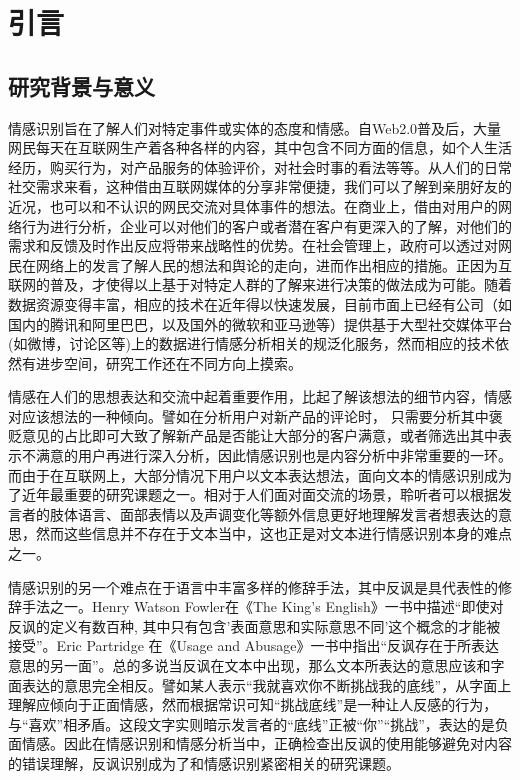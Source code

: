 \chapter{引言}
\label{cha:intro}

\section{研究背景与意义}

情感识别旨在了解人们对特定事件或实体的态度和情感。自Web2.0普及后，大量网民每天在互联网生产着各种各样的内容，其中包含不同方面的信息，如个人生活经历，购买行为，对产品服务的体验评价，对社会时事的看法等等。从人们的日常社交需求来看，这种借由互联网媒体的分享非常便捷，我们可以了解到亲朋好友的近况，也可以和不认识的网民交流对具体事件的想法。在商业上，借由对用户的网络行为进行分析，企业可以对他们的客户或者潜在客户有更深入的了解，对他们的需求和反馈及时作出反应将带来战略性的优势。在社会管理上，政府可以透过对网民在网络上的发言了解人民的想法和舆论的走向，进而作出相应的措施。正因为互联网的普及，才使得以上基于对特定人群的了解来进行决策的做法成为可能。随着数据资源变得丰富，相应的技术在近年得以快速发展，目前市面上已经有公司（如国内的腾讯和阿里巴巴，以及国外的微软和亚马逊等）提供基于大型社交媒体平台(如微博，讨论区等)上的数据进行情感分析相关的规泛化服务，然而相应的技术依然有进步空间，研究工作还在不同方向上摸索。

情感在人们的思想表达和交流中起着重要作用\cite{Banerjee2015Detection}，比起了解该想法的细节内容，情感对应该想法的一种倾向。譬如在分析用户对新产品的评论时，
只需要分析其中褒贬意见的占比即可大致了解新产品是否能让大部分的客户满意，或者筛选出其中表示不满意的用户再进行深入分析，因此情感识别也是内容分析中非常重要的一环。而由于在互联网上，大部分情况下用户以文本表达想法，面向文本的情感识别成为了近年最重要的研究课题之一。相对于人们面对面交流的场景，聆听者可以根据发言者的肢体语言、面部表情以及声调变化等额外信息更好地理解发言者想表达的意思，然而这些信息并不存在于文本当中，这也正是对文本进行情感识别本身的难点之一\cite{SemEval2019Task3}。

情感识别的另一个难点在于语言中丰富多样的修辞手法，其中反讽是具代表性的修辞手法之一。Henry Watson Fowler在《The King's English》一书中描述“即使对反讽的定义有数百种, 其中只有包含'表面意思和实际意思不同'这个概念的才能被接受”。Eric Partridge 在《Usage and Abusage》一书中指出“反讽存在于所表达意思的另一面”。总的多说当反讽在文本中出现，那么文本所表达的意思应该和字面表达的意思完全相反。譬如某人表示“我就喜欢你不断挑战我的底线”，从字面上理解应倾向于正面情感，然而根据常识可知“挑战底线”是一种让人反感的行为，与“喜欢”相矛盾。这段文字实则暗示发言者的“底线”正被“你”“挑战”，表达的是负面情感。因此在情感识别和情感分析当中，正确检查出反讽的使用能够避免对内容的错误理解，反讽识别成为了和情感识别紧密相关的研究课题。

